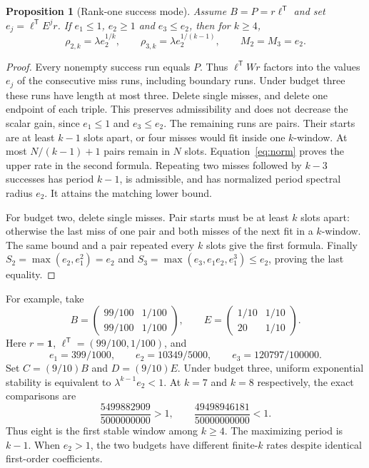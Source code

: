 \documentclass[11pt,letterpaper]{article}
\newtheorem{proposition}[theorem]{Proposition}
\theoremstyle{remark}
\newcommand{\ones}{\mathbf 1}
\newcommand{\transpose}{^{\mathsf T}}
\begin{document}
\begin{proposition}[Rank-one success mode]\label{prop:reset}
Assume $B=P=r\ell\transpose$ and set $e_j=\ell\transpose E^j r$.
If $e_1\le1$, $e_2\ge1$ and $e_3\le e_2$, then for $k\ge4$,
\begin{equation}\label{eq:reset}
 \rho_{2,k}=\lambda e_2^{1/k},\qquad
 \rho_{3,k}=\lambda e_2^{1/(k-1)},\qquad M_2=M_3=e_2.
\end{equation}
\end{proposition}
\begin{proof}
Every nonempty success run equals $P$. Thus $\ell\transpose Wr$
factors into the values $e_j$ of the consecutive miss runs, including
boundary runs. Under budget three these runs have length at most three.
Delete single misses, and delete one endpoint of each triple. This
preserves admissibility and does not decrease the scalar gain, since
$e_1\le1$ and $e_3\le e_2$. The remaining runs are pairs.
Their starts are at least $k-1$ slots apart, or four misses would fit
inside one $k$-window. At most $N/(k-1)+1$ pairs remain in $N$ slots.
Equation~\eqref{eq:norm} proves the upper rate in the second formula.
Repeating two misses followed by $k-3$ successes has period $k-1$,
is admissible, and has normalized period spectral radius $e_2$.
It attains the matching lower bound.

For budget two, delete single misses. Pair starts must be at least
$k$ slots apart: otherwise the last miss of one pair and both misses
of the next fit in a $k$-window. The same bound and a pair repeated
every $k$ slots give the first formula. Finally
$S_2=\max(e_2,e_1^2)=e_2$ and
$S_3=\max(e_3,e_1e_2,e_1^3)\le e_2$, proving the last equality.
\end{proof}

For example, take
\[
 B=\begin{pmatrix}99/100&1/100\\99/100&1/100\end{pmatrix},
 \qquad E=\begin{pmatrix}1/10&1/10\\20&1/10\end{pmatrix}.
\]
Here $r=\ones$, $\ell\transpose=(99/100,1/100)$, and
\[
 e_1=399/1000,\qquad e_2=10349/5000,\qquad e_3=120797/100000.
\]
Set $C=(9/10)B$ and $D=(9/10)E$. Under budget three, uniform
exponential stability is equivalent to $\lambda^{k-1}e_2<1$.
At $k=7$ and $k=8$ respectively, the exact comparisons are
\[
 \frac{5499882909}{5000000000}>1,\qquad
 \frac{49498946181}{50000000000}<1.
\]
Thus eight is the first stable window among $k\ge4$. The maximizing
period is $k-1$. When $e_2>1$, the two budgets have different finite-$k$
rates despite identical first-order coefficients.
\end{document}
